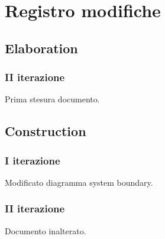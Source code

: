 \documentclass[10pt]{softeng} %
\begin{document}
\startofdocument{}









\clearpage

\section{Registro modifiche}

\subsection{Elaboration}

\subsubsection{II iterazione}

Prima stesura documento.

\subsection{Construction}

\subsubsection{I iterazione}

Modificato diagramma system boundary.

\subsubsection{II iterazione}

Documento inalterato.


\printcustombib{}

\end{document}

